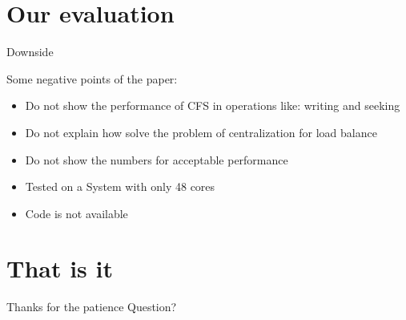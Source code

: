 \documentclass{beamer}
\begin{document}
\section{Our evaluation}

	\begin{frame}{Downside}

	Some negative points of the paper:
	\begin{itemize}
	\item Do not show the performance of CFS in operations like: writing and seeking
	\item Do not explain how solve the problem of centralization for load balance
	\item Do not show the numbers for acceptable performance
	\item Tested on a System with only 48 cores
	\item Code is not available
	\end{itemize}

	\end{frame}

\section{That is it}

	\begin{frame}{}

	\begin{alertblock}{Thanks for the patience}
	Question?
	\end{alertblock}

	\end{frame}
\end{document}
